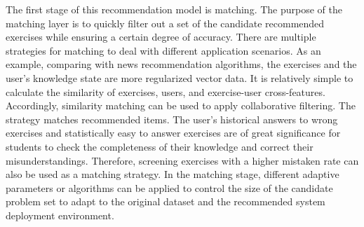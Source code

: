 The first stage of this recommendation model is matching. The purpose of the matching layer is to quickly filter out a set of the candidate recommended exercises while ensuring a certain degree of accuracy. There are multiple strategies for matching to deal with different application scenarios. As an example, comparing with news recommendation algorithms, the exercises and the user's knowledge state are more regularized vector data. It is relatively simple to calculate the similarity of exercises, users, and exercise-user cross-features. Accordingly, similarity matching can be used to apply collaborative filtering. The strategy matches recommended items. The user's historical answers to wrong exercises and statistically easy to answer exercises are of great significance for students to check the completeness of their knowledge and correct their misunderstandings. Therefore, screening exercises with a higher mistaken rate can also be used as a matching strategy. In the matching stage, different adaptive parameters or algorithms can be applied to control the size of the candidate problem set to adapt to the original dataset and the recommended system deployment environment.

